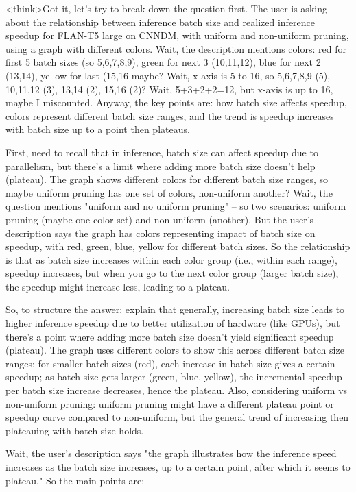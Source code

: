 <think>Got it, let's try to break down the question first. The user is asking about the relationship between inference batch size and realized inference speedup for FLAN-T5 large on CNNDM, with uniform and non-uniform pruning, using a graph with different colors. Wait, the description mentions colors: red for first 5 batch sizes (so 5,6,7,8,9), green for next 3 (10,11,12), blue for next 2 (13,14), yellow for last (15,16 maybe? Wait, x-axis is 5 to 16, so 5,6,7,8,9 (5), 10,11,12 (3), 13,14 (2), 15,16 (2)? Wait, 5+3+2+2=12, but x-axis is up to 16, maybe I miscounted. Anyway, the key points are: how batch size affects speedup, colors represent different batch size ranges, and the trend is speedup increases with batch size up to a point then plateaus.

First, need to recall that in inference, batch size can affect speedup due to parallelism, but there's a limit where adding more batch size doesn't help (plateau). The graph shows different colors for different batch size ranges, so maybe uniform pruning has one set of colors, non-uniform another? Wait, the question mentions "uniform and no uniform pruning" – so two scenarios: uniform pruning (maybe one color set) and non-uniform (another). But the user's description says the graph has colors representing impact of batch size on speedup, with red, green, blue, yellow for different batch sizes. So the relationship is that as batch size increases within each color group (i.e., within each range), speedup increases, but when you go to the next color group (larger batch size), the speedup might increase less, leading to a plateau.

So, to structure the answer: explain that generally, increasing batch size leads to higher inference speedup due to better utilization of hardware (like GPUs), but there's a point where adding more batch size doesn't yield significant speedup (plateau). The graph uses different colors to show this across different batch size ranges: for smaller batch sizes (red), each increase in batch size gives a certain speedup; as batch size gets larger (green, blue, yellow), the incremental speedup per batch size increase decreases, hence the plateau. Also, considering uniform vs non-uniform pruning: uniform pruning might have a different plateau point or speedup curve compared to non-uniform, but the general trend of increasing then plateauing with batch size holds.

Wait, the user's description says "the graph illustrates how the inference speed increases as the batch size increases, up to a certain point, after which it seems to plateau." So the main points are:


